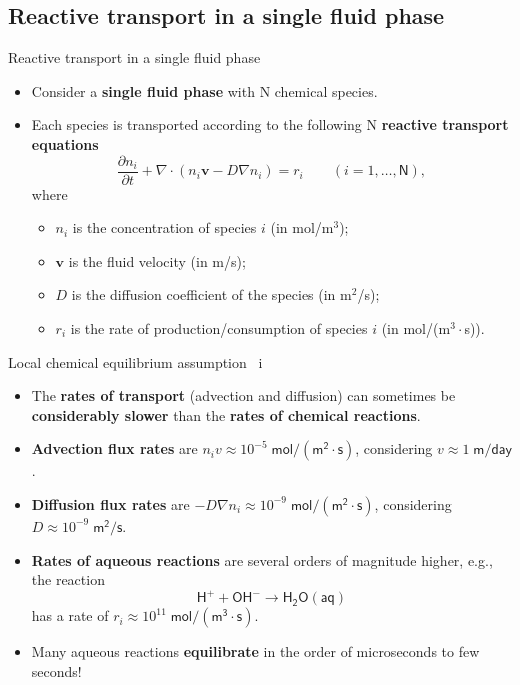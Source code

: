 \subsection{Reactive transport in a single fluid phase}
\begin{frame}{Reactive transport in a single fluid phase}
\begin{itemize}
\item Consider a \alert{\bf single fluid phase} with N chemical species.
\item Each species is transported according to the following N \alert{\bf reactive transport equations}
\[
\frac{\partial n_{i}}{\partial t}+\nabla\cdot(n_{i}\boldsymbol{v}-D\nabla n_{i})=r_{i}\qquad(i=1,\ldots,\mathsf{N}),
\]
where
\begin{itemize}
\item $n_{i}$ is the \alert{concentration} of species $i$ (in mol/m$^{3}$);
\item $\boldsymbol{v}$ is the \alert{fluid velocity}
(in m/s);
\item $D$ is the \alert{diffusion coefficient} of the species (in m$^{2}$/s);
\item $r_{i}$ is the \alert{rate of production\slash consumption} of species
$i$ (in mol/(m$^{3}\cdot$s)). 
\end{itemize}
\end{itemize}
\end{frame}
%
%
\begin{frame}[<+->]{Local chemical equilibrium assumption \, i}
\begin{itemize}
\item The \alert{\bf rates of transport} (advection and diffusion) can sometimes
be {\bf considerably slower }than the \alert{\bf rates of chemical reactions}.
\item \alert{\bf Advection flux rates} are $n_{i}v\approx10^{-5}\;\mathsf{mol/(m^{2}\cdot s)}$,
considering $v\approx1\;\mathsf{m/day}$.
\item \alert{\bf Diffusion flux rates} are $-D\nabla n_{i}\approx10^{-9}\;\mathsf{mol/(m^{2}\cdot s)}$,
considering $D\approx10^{-9}\;\mathsf{m^{2}/s}$.
\item \alert{\bf Rates of aqueous reactions} are several orders of magnitude
higher, e.g., the reaction
\[
\mathsf{H^{+}+OH^{-}\rightarrow H_{2}O(aq)}
\]
has a rate of $r_{i}\approx10^{11}\;\mathsf{mol/(m^3\cdot s)}$. 
\item Many aqueous reactions {\bf equilibrate} in the order of microseconds
to few seconds!
\end{itemize}
\end{frame}
